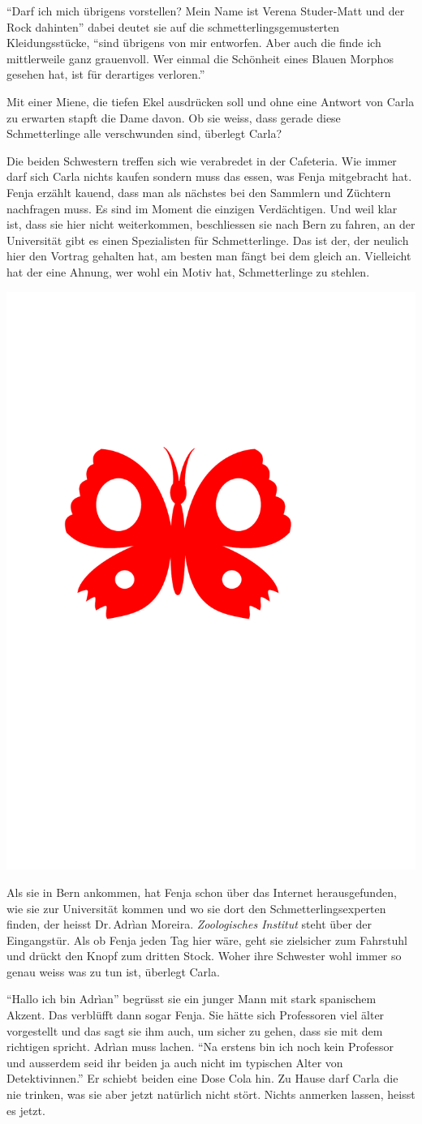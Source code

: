\enquote{Darf ich mich übrigens vorstellen? Mein Name ist Verena Studer-Matt und der Rock dahinten} dabei deutet sie auf die schmetterlingsgemusterten Kleidungsstücke, \enquote{sind übrigens von mir entworfen. Aber auch die finde ich mittlerweile ganz grauenvoll. Wer einmal die Schönheit eines Blauen Morphos gesehen hat, ist für derartiges verloren.} 


Mit einer Miene, die tiefen Ekel ausdrücken soll und ohne eine Antwort von Carla zu erwarten stapft die Dame davon. Ob sie weiss, dass gerade diese Schmetterlinge alle verschwunden sind, überlegt Carla?

Die beiden Schwestern treffen sich wie verabredet in der Cafeteria. Wie immer darf sich Carla nichts kaufen sondern muss das essen, was Fenja mitgebracht hat. Fenja erzählt kauend, dass man als nächstes bei den Sammlern und Züchtern nachfragen muss. Es sind im Moment die einzigen Verdächtigen. Und weil klar ist, dass sie hier nicht weiterkommen, beschliessen sie nach Bern zu fahren, an der Universität gibt es einen Spezialisten für Schmetterlinge. Das ist der, der neulich hier den Vortrag gehalten hat, am besten man fängt bei dem gleich an. Vielleicht hat der eine Ahnung, wer wohl ein Motiv hat, Schmetterlinge zu stehlen.
\begin{center}
\includegraphics[width=.05\textwidth]{bilder/inkling.pdf}
\end{center}
Als sie in Bern ankommen, hat Fenja schon über das Internet herausgefunden, wie sie zur Universität kommen und wo sie dort den Schmetterlingsexperten finden, der heisst Dr.\,Adrìan Moreira. \emph{Zoologisches Institut} steht über der Eingangstür. Als ob Fenja jeden Tag hier wäre, geht sie zielsicher zum Fahrstuhl und drückt den Knopf zum dritten Stock. Woher ihre Schwester wohl immer so genau weiss was zu tun ist, überlegt Carla.

\enquote{Hallo ich bin Adrìan} begrüsst sie ein junger Mann mit stark spanischem Akzent. Das verblüfft dann sogar Fenja. Sie hätte sich Professoren viel älter vorgestellt und das sagt sie ihm auch, um sicher zu gehen, dass sie mit dem richtigen spricht. Adrìan muss lachen. \enquote{Na erstens bin ich noch kein Professor und ausserdem seid ihr beiden ja auch nicht im typischen Alter von Detektivinnen.} Er schiebt beiden eine Dose Cola hin. Zu Hause darf Carla die nie trinken, was sie aber jetzt natürlich nicht stört. Nichts anmerken lassen, heisst es jetzt.

